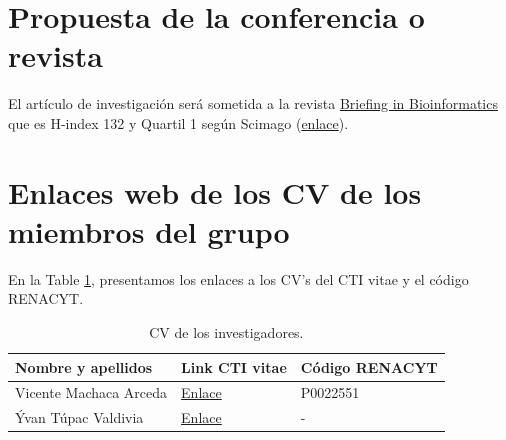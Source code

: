 \documentclass[a4paper]{article}
\begin{document}
\section{Propuesta de la conferencia o revista}

El artículo de investigación será sometida  a la revista  \href{https://academic.oup.com/bib?campaignid=20617591354&adgroupid=&adid=&gclid=Cj0KCQjwsp6pBhCfARIsAD3GZuar7JO7kkA0brznfmZRDJJH5NDhGjJsyhTv859p33ddEqtW1Z5JkfQaAvEZEALw_wcB}{ Briefing in Bioinformatics} que es H-index 132 y Quartil 1 según Scimago (\href{https://www.scimagojr.com/journalsearch.php?q=17956&tip=sid&clean=0}{enlace}). 


\section{Enlaces web de los CV de los miembros del grupo }

En la Table \ref{tab:inve}, presentamos los enlaces a los CV's del CTI vitae y el código RENACYT.

\begin{table}[H]
\centering
\caption{CV de los investigadores.}
\label{tab:inve}
\setlength{\tabcolsep}{0.5em} %
{\renewcommand{\arraystretch}{1.2}%
\begin{tabular}{|p{5.3cm}p{4cm}p{5cm}|} \hline
\textbf{Nombre y apellidos} & \textbf{Link CTI vitae}                                                                      & \textbf{Código RENACYT} \\ \hline
Vicente Machaca Arceda      & \href{https://dina.concytec.gob.pe/appDirectorioCTI/VerDatosInvestigador.do?id\_investigador=22551}{Enlace} & P0022551                \\
Ývan Túpac Valdivia    & \href{https://dina.concytec.gob.pe/appDirectorioCTI/VerDatosInvestigador.do?id_investigador=4409}{Enlace} & -     \\ \hline                 
\end{tabular}
}
\end{table}


	
\end{document}
